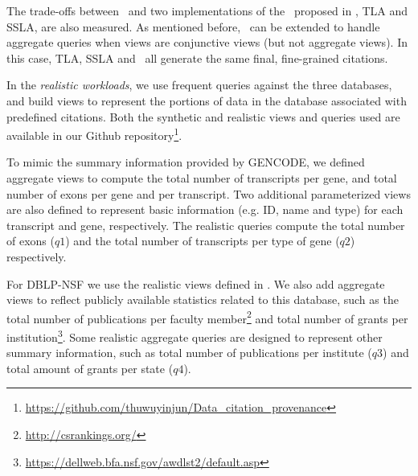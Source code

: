 The trade-offs between \provalg\ and two implementations of the \rba\ proposed in \cite{wu2018data}, TLA and SSLA, are also  measured. 
As mentioned before, \rba\ can be extended to handle aggregate queries when views are conjunctive views (but not aggregate views). In this case, TLA, SSLA and \provalg\ all generate the same final, fine-grained citations.


In the {\em realistic workloads}, we use frequent queries against the three databases, and build views to represent the portions of data in the database associated with predefined citations. Both the synthetic and realistic views and queries used are available in our Github repository\footnote{\url{https://github.com/thuwuyinjun/Data_citation_provenance}}. 

To mimic the summary information provided by GENCODE, we defined aggregate views to compute the total number of transcripts per gene, and total number of exons per gene and per transcript. Two additional parameterized views are also defined to represent basic information (e.g. ID, name and type) for each transcript and gene, respectively. The realistic queries  compute the total number of exons ($q1$) and the total number of transcripts per type of gene ($q2$) respectively.

For DBLP-NSF we use the realistic views defined in \cite{wu2018data}. We also add aggregate views to reflect publicly available statistics related to this database, such as the total number of publications per faculty member\footnote{\url{http://csrankings.org/}} and total number of grants per institution\footnote{\url{https://dellweb.bfa.nsf.gov/awdlst2/default.asp}}. Some realistic aggregate queries are designed to represent other summary information, such as total number of publications per institute ($q3$) and total amount of grants per state ($q4$).

